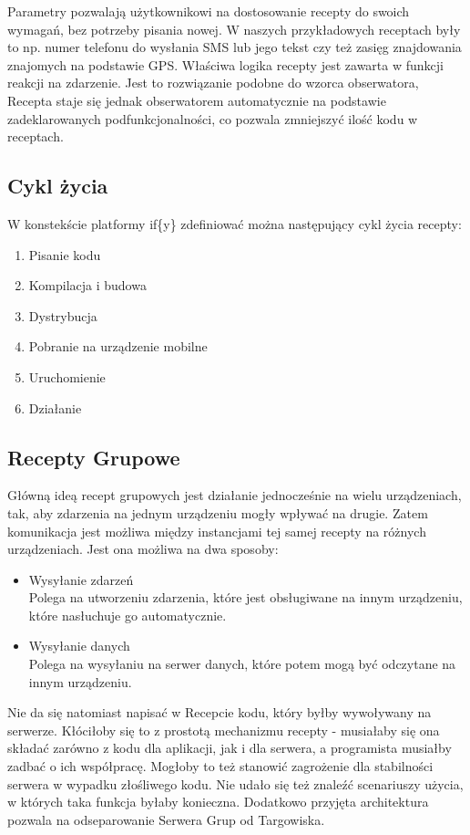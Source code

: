 \documentclass[11pt,a4paper,polish,thesis]{dcsbook}
\begin{document}
Parametry pozwalają użytkownikowi na dostosowanie recepty do swoich wymagań, bez potrzeby pisania nowej. W naszych przykładowych receptach były to np. numer telefonu do wysłania SMS lub jego tekst czy też zasięg znajdowania znajomych na podstawie GPS.
Właściwa logika recepty jest zawarta w funkcji reakcji na zdarzenie. Jest to rozwiązanie podobne do wzorca obserwatora, Recepta staje się jednak obserwatorem automatycznie na podstawie zadeklarowanych podfunkcjonalności, co pozwala zmniejszyć ilość kodu w receptach.

\subsection{Cykl życia}
W konstekście platformy if\{y\} zdefiniować można następujący cykl życia recepty:
\begin{enumerate}
\item Pisanie kodu
\item Kompilacja i budowa
\item Dystrybucja
\item Pobranie na urządzenie mobilne
\item Uruchomienie
\item Działanie
\end{enumerate}

\subsection{Recepty Grupowe}
Główną ideą recept grupowych jest działanie jednocześnie na wielu urządzeniach, tak, aby zdarzenia na jednym urządzeniu mogły wpływać na drugie. Zatem komunikacja jest możliwa między instancjami  tej samej recepty na różnych urządzeniach. Jest ona możliwa na dwa sposoby:
\begin{itemize}
\item{Wysyłanie zdarzeń}\\
Polega na utworzeniu zdarzenia, które jest obsługiwane na innym urządzeniu, które nasłuchuje go automatycznie.
\item{Wysyłanie danych}\\
Polega na wysyłaniu na serwer danych, które potem mogą być odczytane na innym urządzeniu.
\end{itemize}
Nie da się natomiast napisać w Recepcie kodu, który byłby wywoływany na serwerze. Kłóciłoby się to z prostotą mechanizmu recepty - musiałaby się ona składać zarówno z kodu dla aplikacji, jak i dla serwera, a programista musiałby zadbać o ich współpracę. Mogłoby to też stanowić zagrożenie dla stabilności serwera w wypadku złośliwego kodu.
Nie udało się też znaleźć scenariuszy użycia, w których taka funkcja byłaby konieczna. Dodatkowo przyjęta architektura pozwala na odseparowanie Serwera Grup od Targowiska. 
\end{document}
